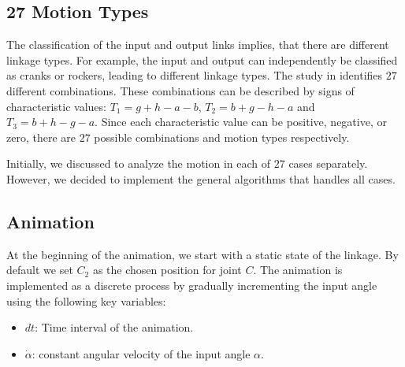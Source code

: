 \documentclass{article}
\begin{document}
 \subsection{27 Motion Types}\label{ch:27_motion_types}
 
 The classification of the input and output links implies, that there are different linkage types. For example, the input and output can independently be classified as cranks or rockers, leading to different linkage types. The study in \cite{inproceedings} identifies $27$ different combinations. These combinations can be described by signs of characteristic values: $T_1 = g + h - a - b$, $T_2 = b + g - h - a$ and $T_3 = b + h - g - a$. Since each characteristic value can be positive, negative, or zero, there are $27$ possible combinations and motion types respectively.
 
 Initially, we discussed to analyze the motion in each of $27$ cases separately. However, we decided to implement the general algorithms that handles all cases.
 

 \subsection{Animation}

 At the beginning of the animation, we start with a static state of the linkage. By default we set $C_2$ as the chosen position for joint $C$.
 The animation is implemented as a discrete process by gradually incrementing the input angle using the following key variables:
 \begin{itemize}
 	\item $dt$: Time interval of the animation.
 	\item $\dot{\alpha}$: constant angular velocity of the input angle $\alpha$.
 \end{itemize}
\end{document}
